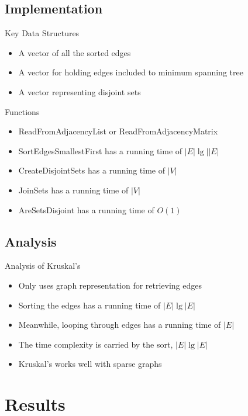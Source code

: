 \documentclass{beamer}
\begin{document}
\subsection{Implementation}
\begin{frame}{Key Data Structures}
    \begin{itemize}
    \item A vector of all the sorted edges
    \item A vector for holding edges included to minimum spanning tree
    \item A vector representing disjoint sets
    \end{itemize}
\end{frame}

\begin{frame}{Functions}
    \begin{itemize}
    \item ReadFromAdjacencyList or ReadFromAdjacencyMatrix
    \item SortEdgesSmallestFirst has a running time of $|E|\lg||E|$
    \item CreateDisjointSets has a running time of $|V|$
    \item JoinSets has a running time of $|V|$
    \item AreSetsDisjoint has a running time of $O(1)$
    \end{itemize}
\end{frame}

\subsection{Analysis}
\begin{frame}{Analysis of Kruskal's}
    \begin{itemize}
    \item Only uses graph representation for retrieving edges
    \item Sorting the edges has a running time of $|E|\lg|E|$
    \item Meanwhile, looping through edges has a running time of $|E|$
    \item The time complexity is carried by the sort, $|E|\lg|E|$
    \item Kruskal's works well with sparse graphs
    \end{itemize}   
\end{frame}


\section{Results}\frame{\sectionpage}
\end{document}
